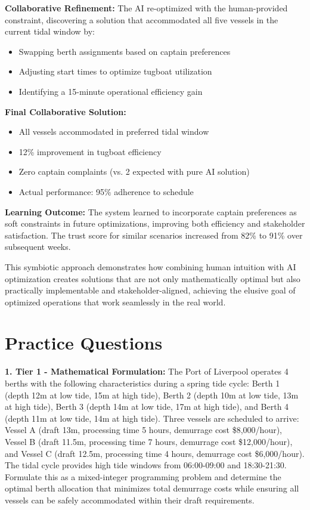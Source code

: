 \documentclass{article}
\begin{document}
\textbf{Collaborative Refinement:}
The AI re-optimized with the human-provided constraint, discovering a solution that accommodated all five vessels in the current tidal window by:
\begin{itemize}
\item Swapping berth assignments based on captain preferences
\item Adjusting start times to optimize tugboat utilization
\item Identifying a 15-minute operational efficiency gain
\end{itemize}

\textbf{Final Collaborative Solution:}
\begin{itemize}
\item All vessels accommodated in preferred tidal window
\item 12\% improvement in tugboat efficiency
\item Zero captain complaints (vs. 2 expected with pure AI solution)
\item Actual performance: 95\% adherence to schedule
\end{itemize}

\textbf{Learning Outcome:} The system learned to incorporate captain preferences as soft constraints in future optimizations, improving both efficiency and stakeholder satisfaction. The trust score for similar scenarios increased from 82\% to 91\% over subsequent weeks.

This symbiotic approach demonstrates how combining human intuition with AI optimization creates solutions that are not only mathematically optimal but also practically implementable and stakeholder-aligned, achieving the elusive goal of optimized operations that work seamlessly in the real world.

\section{Practice Questions}

\textbf{1. Tier 1 - Mathematical Formulation:} The Port of Liverpool operates 4 berths with the following characteristics during a spring tide cycle: Berth 1 (depth 12m at low tide, 15m at high tide), Berth 2 (depth 10m at low tide, 13m at high tide), Berth 3 (depth 14m at low tide, 17m at high tide), and Berth 4 (depth 11m at low tide, 14m at high tide). Three vessels are scheduled to arrive: Vessel A (draft 13m, processing time 5 hours, demurrage cost \$8,000/hour), Vessel B (draft 11.5m, processing time 7 hours, demurrage cost \$12,000/hour), and Vessel C (draft 12.5m, processing time 4 hours, demurrage cost \$6,000/hour). The tidal cycle provides high tide windows from 06:00-09:00 and 18:30-21:30. Formulate this as a mixed-integer programming problem and determine the optimal berth allocation that minimizes total demurrage costs while ensuring all vessels can be safely accommodated within their draft requirements.
\end{document}

